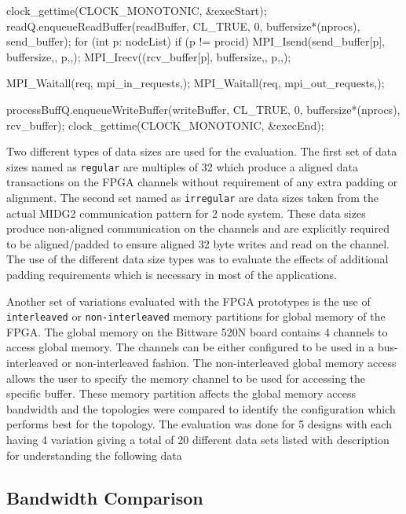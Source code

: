 \begin{CppCode}[caption=Pseudo-code to perform MPI+PCIe based data communication
    between FPGAs, frame=tlrb, label=code:mpi_proto, float]
clock_gettime(CLOCK_MONOTONIC, &execStart);
readQ.enqueueReadBuffer(readBuffer, CL_TRUE, 0, buffersize*(nprocs), send_buffer);
for (int p: nodeList)
{
    if (p != procid)
    {
        MPI_Isend(send_buffer[p], buffersize,, p,,);
        MPI_Irecv((rcv_buffer[p], buffersize,, p,,);
    }
}

MPI_Waitall(req, mpi_in_requests,);
MPI_Waitall(req, mpi_out_requests,);

processBuffQ.enqueueWriteBuffer(writeBuffer, CL_TRUE, 0, buffersize*(nprocs), rcv_buffer);
clock_gettime(CLOCK_MONOTONIC, &execEnd);
\end{CppCode}

Two different types of data sizes are used for the evaluation. The first set of data
sizes named as \texttt{regular} are multiples of 32 which produce a aligned data transactions
on the FPGA channels without requirement of any extra padding or alignment.
The second set named as \texttt{irregular} are data sizes taken from the actual
MIDG2 communication pattern for 2 node system. These data sizes produce
non-aligned communication on the channels and are explicitly required to be
aligned/padded to ensure aligned 32 byte writes and read on the channel.
The use of the different data size types was to evaluate the effects of additional
padding requirements which is necessary in most of the applications.

Another set of variations evaluated with the FPGA prototypes is the use of
\texttt{interleaved} or \texttt{non-interleaved} memory partitions for global memory of the FPGA.
The global memory on the Bittware 520N board
contains 4 channels to access global memory. The channels can be
either configured to be used in a bus-interleaved or non-interleaved fashion.
The non-interleaved global memory access allows the user to specify the
memory channel to be used for accessing the specific buffer. These
memory partition affects the global memory access bandwidth and
the topologies were compared to identify the configuration which performs
best for the topology. The evaluation was done for 5 designs with each
having 4 variation giving a total of 20 different data sets listed with
description for understanding the following data

\subsection{Bandwidth Comparison}

